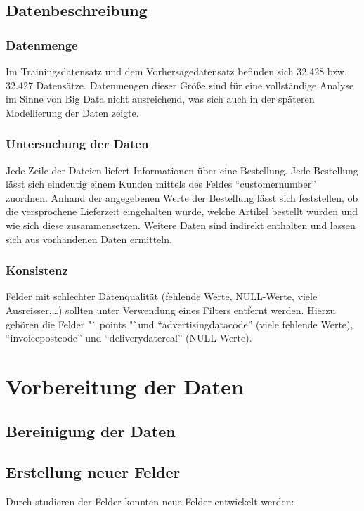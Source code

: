 \documentclass[a4paper,12pt]{article}
\begin{document}
\subsection{Datenbeschreibung}

\subsubsection{Datenmenge}
Im Trainingsdatensatz und dem Vorhersagedatensatz befinden sich 32.428 bzw. 32.427 Datensätze.
Datenmengen dieser Größe sind für eine vollständige Analyse im Sinne von Big Data nicht
ausreichend, was sich auch in der späteren Modellierung der Daten zeigte.

\subsubsection{Untersuchung der Daten}

Jede Zeile der Dateien liefert Informationen über eine Bestellung. Jede Bestellung lässt sich eindeutig einem Kunden mittels des
Feldes "`customernumber"' zuordnen. Anhand der angegebenen Werte der Bestellung lässt sich
feststellen, ob die versprochene Lieferzeit eingehalten wurde, welche Artikel bestellt wurden
und wie sich diese zusammensetzen. Weitere Daten sind indirekt enthalten und lassen sich aus vorhandenen Daten ermitteln.

\subsubsection{Konsistenz}
Felder mit schlechter Datenqualität (fehlende Werte, NULL-Werte, viele Ausreisser,\ldots) sollten unter Verwendung eines Filters entfernt werden.
Hierzu gehören die Felder "` points "`und "`advertisingdatacode"' (viele fehlende Werte), "`invoicepostcode"' und "`deliverydatereal"' (NULL-Werte).

\section{Vorbereitung der Daten}
\subsection{Bereinigung der Daten}
\subsection{Erstellung neuer Felder}
Durch studieren der Felder konnten neue Felder entwickelt werden:  
\end{document}
